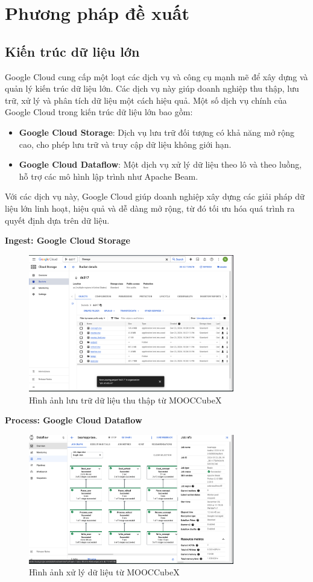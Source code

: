 \section{Phương pháp đề xuất}
\subsection{Kiến trúc dữ liệu lớn}

Google Cloud cung cấp một loạt các dịch vụ và công cụ mạnh mẽ để xây dựng và quản lý kiến trúc dữ liệu lớn. Các dịch vụ này giúp doanh nghiệp thu thập, lưu trữ, xử lý và phân tích dữ liệu một cách hiệu quả. Một số dịch vụ chính của Google Cloud trong kiến trúc dữ liệu lớn bao gồm:

\begin{itemize}
    \item \textbf{Google Cloud Storage}: Dịch vụ lưu trữ đối tượng có khả năng mở rộng cao, cho phép lưu trữ và truy cập dữ liệu không giới hạn.
    \item \textbf{Google Cloud Dataflow}: Một dịch vụ xử lý dữ liệu theo lô và theo luồng, hỗ trợ các mô hình lập trình như Apache Beam.
\end{itemize}
Với các dịch vụ này, Google Cloud giúp doanh nghiệp xây dựng các giải pháp dữ liệu lớn linh hoạt, hiệu quả và dễ dàng mở rộng, từ đó tối ưu hóa quá trình ra quyết định dựa trên dữ liệu.

\textbf{Ingest: Google Cloud Storage}
\begin{figure}[H]
    \centering
    \includegraphics[width=0.8\textwidth]{figures/73.png}
    \caption{Hình ảnh lưu trữ dữ liệu thu thập từ MOOCCubeX}
\end{figure}

\textbf{Process: Google Cloud Dataflow}
\begin{figure}[H]
    \centering
    \includegraphics[width=0.8\textwidth]{figures/74.png}
    \caption{Hình ảnh xử lý dữ liệu từ MOOCCubeX}
\end{figure}
